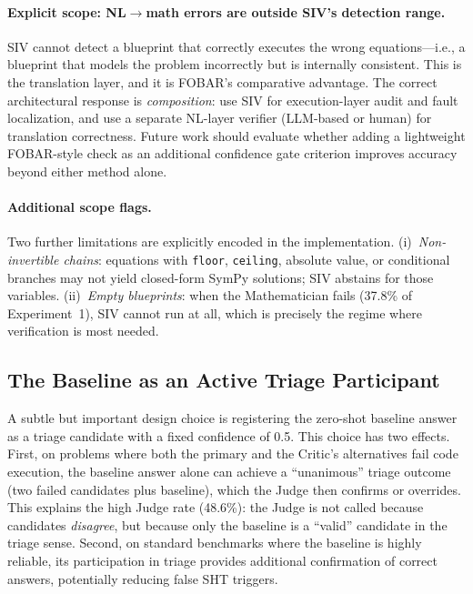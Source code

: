 \documentclass[11pt,a4paper]{article}
\begin{document}
\paragraph{Explicit scope: NL$\to$math errors are outside SIV's detection range.}
SIV cannot detect a blueprint that correctly executes the wrong equations---i.e., a blueprint that models the problem incorrectly but is internally consistent.
This is the translation layer, and it is FOBAR's comparative advantage.
The correct architectural response is \emph{composition}: use SIV for execution-layer audit and fault localization, and use a separate NL-layer verifier (LLM-based or human) for translation correctness.
Future work should evaluate whether adding a lightweight FOBAR-style check as an additional confidence gate criterion improves accuracy beyond either method alone.

\paragraph{Additional scope flags.}
Two further limitations are explicitly encoded in the implementation.
(i)~\emph{Non-invertible chains}: equations with \texttt{floor}, \texttt{ceiling}, absolute value, or conditional branches may not yield closed-form SymPy solutions; SIV abstains for those variables.
(ii)~\emph{Empty blueprints}: when the Mathematician fails (37.8\% of Experiment~1), SIV cannot run at all, which is precisely the regime where verification is most needed.

\subsection{The Baseline as an Active Triage Participant}
A subtle but important design choice is registering the zero-shot baseline answer as a triage candidate with a fixed confidence of 0.5.
This choice has two effects.
First, on problems where both the primary and the Critic's alternatives fail code execution, the baseline answer alone can achieve a ``unanimous'' triage outcome (two failed candidates plus baseline), which the Judge then confirms or overrides.
This explains the high Judge rate (48.6\%): the Judge is not called because candidates \emph{disagree}, but because only the baseline is a ``valid'' candidate in the triage sense.
Second, on standard benchmarks where the baseline is highly reliable, its participation in triage provides additional confirmation of correct answers, potentially reducing false SHT triggers.
\end{document}
